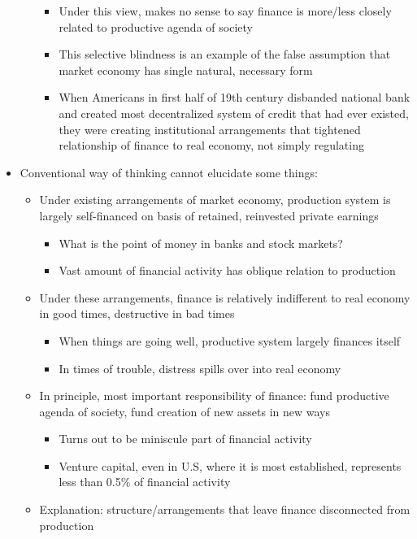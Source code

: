 \begin{itemize}
\begin{itemize}
    \begin{itemize}
    \tightlist
    \item
      Under this view, makes no sense to say finance is more/less
      closely related to productive agenda of society
    \item
      This selective blindness is an example of the false assumption
      that market economy has single natural, necessary form
    \item
      When Americans in first half of 19th century disbanded national
      bank and created most decentralized system of credit that had ever
      existed, they were creating institutional arrangements that
      tightened relationship of finance to real economy, not simply
      regulating
    \end{itemize}
  \end{itemize}
\item
  Conventional way of thinking cannot elucidate some things:

  \begin{itemize}
  \tightlist
  \item
    Under existing arrangements of market economy, production system is
    largely self-financed on basis of retained, reinvested private
    earnings

    \begin{itemize}
    \tightlist
    \item
      What is the point of money in banks and stock markets?
    \item
      Vast amount of financial activity has oblique relation to
      production
    \end{itemize}
  \item
    Under these arrangements, finance is relatively indifferent to real
    economy in good times, destructive in bad times

    \begin{itemize}
    \tightlist
    \item
      When things are going well, productive system largely finances
      itself
    \item
      In times of trouble, distress spills over into real economy
    \end{itemize}
  \item
    In principle, most important responsibility of finance: fund
    productive agenda of society, fund creation of new assets in new
    ways

    \begin{itemize}
    \tightlist
    \item
      Turns out to be miniscule part of financial activity
    \item
      Venture capital, even in U.S, where it is most established,
      represents less than 0.5\% of financial activity
    \end{itemize}
  \item
    Explanation: structure/arrangements that leave finance disconnected
    from production


\end{itemize}
\end{itemize}
